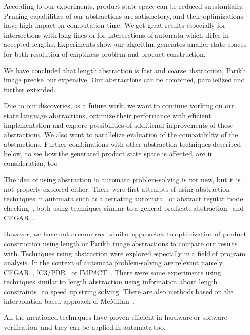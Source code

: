 According to our experiments, product state space can be reduced substantially. Pruning capabilities of our abstractions are satisfactory, and their optimizations have high impact on computation time. We get great results especially for intersections with long lines or for intersections of automata which differ in accepted lengths. Experiments show our algorithm generates smaller state spaces for both resolution of emptiness problem and product construction.

We have concluded that length abstraction is fast and coarse abstraction, Parikh image precise but expensive. Our abstractions can be combined, parallelized and further extended.

Due to our discoveries, as a future work, we want to continue working on our state language abstractions, optimize their performance with efficient implementation and explore possibilities of additional improvements of these abstractions. We also want to parallelize evaluation of the compatibility of the abstractions. Further combinations with other abstraction techniques described below, to see how the generated product state space is affected, are in consideration, too.

The idea of using abstraction in automata problem-solving is not new, but it is not properly explored either. There were first attempts of using abstraction techniques in automata such as alternating automata~\cite{GANTY20103444} or abstract regular model checking~\cite{method_model_checking_tool, rmc_upside_down}, both using techniques similar to a general predicate abstraction~\cite{DBLP:conf/cav/ColonU98, DBLP:conf/cav/GrafS97} and CEGAR~\cite{DBLP:conf/cav/ClarkeGJLV00}.

However, we have not encountered similar approaches to optimization of product construction using length or Parikh image abstractions to compare our results with. Techniques using abstraction were explored especially in a field of program analysis. In the context of automata problem-solving are relevant namely CEGAR~\cite{DBLP:conf/cav/ClarkeGJLV00}, IC3/PDR~\cite{DBLP:conf/sat/HoderB12, DBLP:conf/fmcad/BradleyM07, DBLP:journals/pacmpl/HolikJLRV18, DBLP:conf/cav/WangTLYJ16, DBLP:journals/corr/abs-1708-09073} or IMPACT~\cite{DBLP:conf/cav/McMillan06}. There were some experiments using techniques similar to length abstraction using information about length constraints~\cite{10.1007/978-3-030-81688-9_14} to speed up string solving. There are also methods based on the interpolation-based approach of McMillan~\cite{DBLP:conf/tacas/AmlaM07, DBLP:conf/tacas/GangeNSSS13}.

All the mentioned techniques have proven efficient in hardware or software verification, and they can be applied in automata too.

